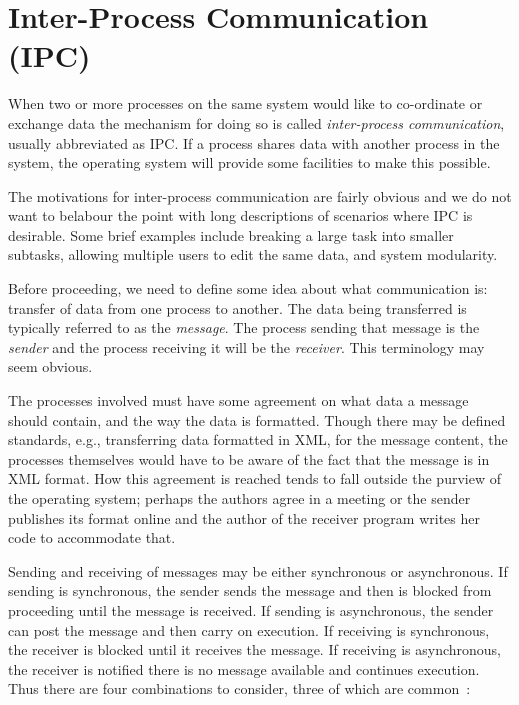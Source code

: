 




\section*{Inter-Process Communication (IPC)}
When two or more processes on the same system would like to co-ordinate or exchange data the mechanism for doing so is called \textit{inter-process communication}, usually abbreviated as IPC. If a process shares data with another process in the system, the operating system will provide some facilities to make this possible. 

The motivations for inter-process communication are fairly obvious and we do not want to belabour the point with long descriptions of scenarios where IPC is desirable. Some brief examples include breaking a large task into smaller subtasks, allowing multiple users to edit the same data, and system modularity.

Before proceeding, we need to define some idea about what communication is: transfer of data from one process to another. The data being transferred is typically referred to as the \textit{message}. The process sending that message is the \textit{sender} and the process receiving it will be the \textit{receiver}. This terminology may seem obvious. 

The processes involved must have some agreement on what data a message should contain, and the way the data is formatted. Though there may be defined standards, e.g., transferring data formatted in XML, for the message content, the processes themselves would have to be aware of the fact that the message is in XML format. How this agreement is reached tends to fall outside the purview of the operating system; perhaps the authors agree in a meeting or the sender publishes its format online and the author of the receiver program writes her code to accommodate that.

Sending and receiving of messages may be either synchronous or asynchronous. If sending is synchronous, the sender sends the message and then is blocked from proceeding until the message is received. If sending is asynchronous, the sender can post the message and then carry on execution. If receiving is synchronous, the receiver is blocked until it receives the message. If receiving is asynchronous, the receiver is notified there is no message available and continues execution. Thus there are four combinations to consider, three of which are common~\cite{mte241}:

